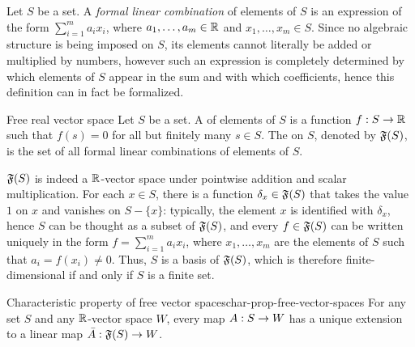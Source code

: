 Let $ S $ be a set. A \emph{formal linear combination} of elements of $ S $ is an expression of the form $ \sum_{i = 1}^m a_i x_i $, where $ a_1 , \dots , a_m \in \mathbb{R} $ and $ x_1 , \dots , x_m \in S $. Since no algebraic structure is being imposed on $ S $, its elements cannot literally be added or multiplied by numbers, however such an expression is completely determined by which elements of $ S $ appear in the sum and with which coefficients, hence this definition can in fact be formalized.

\begin{definition}{Free real vector space}{}
  Let $ S $ be a set. A  of elements of $ S $ is a function $ f : S \rightarrow \mathbb{R} $ such that $ f(s) = 0 $ for all but finitely many $ s \in S $. The  on $ S $, denoted by $ \operatorname{\mathfrak{F}}(S) $, is the set of all formal linear combinations of elements of $ S $.
\end{definition}

$ \operatorname{\mathfrak{F}}(S) $ is indeed a $ \mathbb{R} $-vector space under pointwise addition and scalar multiplication. For each $ x \in S $, there is a function $ \delta_x \in \operatorname{\mathfrak{F}}(S) $ that takes the value $ 1 $ on $ x $ and vanishes on $ S - \{x\} $: typically, the element $ x $ is identified with $ \delta_x $, hence $ S $ can be thought as a subset of $ \operatorname{\mathfrak{F}}(S) $, and every $ f \in \operatorname{\mathfrak{F}}(S) $ can be written uniquely in the form $ f = \sum_{i = 1}^m a_i x_i $, where $ x_1 , \dots , x_m $ are the elements of $ S $ such that $ a_i = f(x_i) \neq 0 $. Thus, $ S $ is a basis of $ \operatorname{\mathfrak{F}}(S) $, which is therefore finite-dimensional if and only if $ S $ is a finite set.

\begin{proposition}{Characteristic property of free vector spaces}{char-prop-free-vector-spaces}
  For any set $ S $ and any $ \mathbb{R} $-vector space $ W $, every map $ A : S \rightarrow W $ has a unique extension to a linear map $ \bar{A} : \operatorname{\mathfrak{F}}(S) \rightarrow W $.
\end{proposition}

